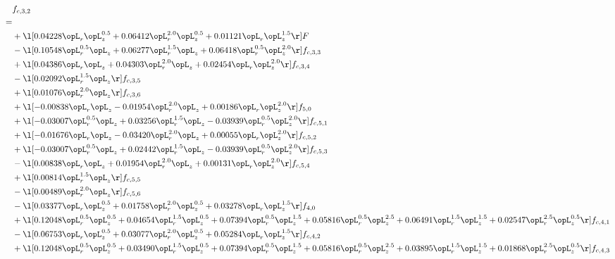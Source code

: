 \begin{alignat}{2} 
\label{eq:f_32_2} 
& f_{c,3,2} \nonumber \\ 
 = \\ 
& + \l[  0.04228 \opL_r \opL_z^{0.5} +  0.06412 \opL_r^{2.0} \opL_z^{0.5} +  0.01121 \opL_r \opL_z^{1.5}  \r] F \nonumber \\ 
& - \l[  0.10548 \opL_r^{0.5} \opL_z +  0.06277 \opL_r^{1.5} \opL_z +  0.06418 \opL_r^{0.5} \opL_z^{2.0}  \r] f_{c,3,3} \nonumber \\ 
& + \l[  0.04386 \opL_r \opL_z +  0.04303 \opL_r^{2.0} \opL_z +  0.02454 \opL_r \opL_z^{2.0}  \r] f_{c,3,4} \nonumber \\ 
& - \l[  0.02092 \opL_r^{1.5} \opL_z  \r] f_{c,3,5} \nonumber \\ 
& + \l[  0.01076 \opL_r^{2.0} \opL_z  \r] f_{c,3,6} \nonumber \\ 
& + \l[  -0.00838 \opL_r \opL_z   -0.01954 \opL_r^{2.0} \opL_z +  0.00186 \opL_r \opL_z^{2.0}  \r] f_{5,0} \nonumber \\ 
& + \l[  -0.03007 \opL_r^{0.5} \opL_z +  0.03256 \opL_r^{1.5} \opL_z   -0.03939 \opL_r^{0.5} \opL_z^{2.0}  \r] f_{c,5,1} \nonumber \\ 
& + \l[  -0.01676 \opL_r \opL_z   -0.03420 \opL_r^{2.0} \opL_z +  0.00055 \opL_r \opL_z^{2.0}  \r] f_{c,5,2} \nonumber \\ 
& + \l[  -0.03007 \opL_r^{0.5} \opL_z +  0.02442 \opL_r^{1.5} \opL_z   -0.03939 \opL_r^{0.5} \opL_z^{2.0}  \r] f_{c,5,3} \nonumber \\ 
& - \l[  0.00838 \opL_r \opL_z +  0.01954 \opL_r^{2.0} \opL_z +  0.00131 \opL_r \opL_z^{2.0}  \r] f_{c,5,4} \nonumber \\ 
& + \l[  0.00814 \opL_r^{1.5} \opL_z  \r] f_{c,5,5} \nonumber \\ 
& - \l[  0.00489 \opL_r^{2.0} \opL_z  \r] f_{c,5,6} \nonumber \\ 
& - \l[  0.03377 \opL_r \opL_z^{0.5} +  0.01758 \opL_r^{2.0} \opL_z^{0.5} +  0.03278 \opL_r \opL_z^{1.5}  \r] f_{4,0} \nonumber \\ 
& + \l[  0.12048 \opL_r^{0.5} \opL_z^{0.5} +  0.04654 \opL_r^{1.5} \opL_z^{0.5} +  0.07394 \opL_r^{0.5} \opL_z^{1.5} +  0.05816 \opL_r^{0.5} \opL_z^{2.5} +  0.06491 \opL_r^{1.5} \opL_z^{1.5} +  0.02547 \opL_r^{2.5} \opL_z^{0.5}  \r] f_{c,4,1} \nonumber \\ 
& - \l[  0.06753 \opL_r \opL_z^{0.5} +  0.03077 \opL_r^{2.0} \opL_z^{0.5} +  0.05284 \opL_r \opL_z^{1.5}  \r] f_{c,4,2} \nonumber \\ 
& + \l[  0.12048 \opL_r^{0.5} \opL_z^{0.5} +  0.03490 \opL_r^{1.5} \opL_z^{0.5} +  0.07394 \opL_r^{0.5} \opL_z^{1.5} +  0.05816 \opL_r^{0.5} \opL_z^{2.5} +  0.03895 \opL_r^{1.5} \opL_z^{1.5} +  0.01868 \opL_r^{2.5} \opL_z^{0.5}  \r] f_{c,4,3} \nonumber \\ 

\end{alignat}
